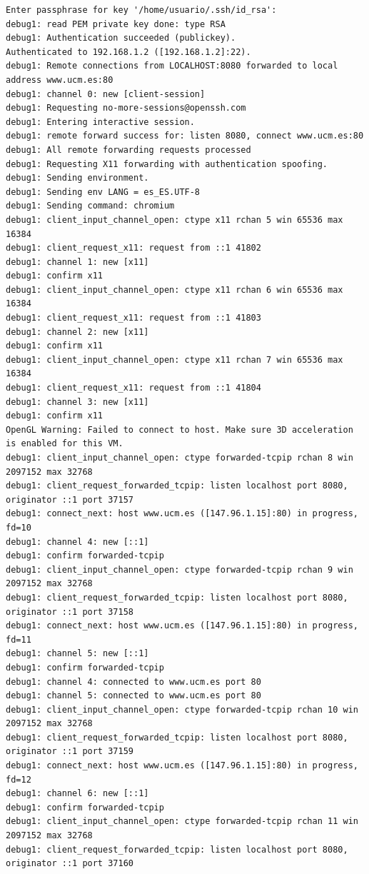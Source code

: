 \documentclass[11pt]{article}
\begin{document}
\begin{lstlisting}
Enter passphrase for key '/home/usuario/.ssh/id_rsa': 
debug1: read PEM private key done: type RSA
debug1: Authentication succeeded (publickey).
Authenticated to 192.168.1.2 ([192.168.1.2]:22).
debug1: Remote connections from LOCALHOST:8080 forwarded to local address www.ucm.es:80
debug1: channel 0: new [client-session]
debug1: Requesting no-more-sessions@openssh.com
debug1: Entering interactive session.
debug1: remote forward success for: listen 8080, connect www.ucm.es:80
debug1: All remote forwarding requests processed
debug1: Requesting X11 forwarding with authentication spoofing.
debug1: Sending environment.
debug1: Sending env LANG = es_ES.UTF-8
debug1: Sending command: chromium
debug1: client_input_channel_open: ctype x11 rchan 5 win 65536 max 16384
debug1: client_request_x11: request from ::1 41802
debug1: channel 1: new [x11]
debug1: confirm x11
debug1: client_input_channel_open: ctype x11 rchan 6 win 65536 max 16384
debug1: client_request_x11: request from ::1 41803
debug1: channel 2: new [x11]
debug1: confirm x11
debug1: client_input_channel_open: ctype x11 rchan 7 win 65536 max 16384
debug1: client_request_x11: request from ::1 41804
debug1: channel 3: new [x11]
debug1: confirm x11
OpenGL Warning: Failed to connect to host. Make sure 3D acceleration is enabled for this VM.
debug1: client_input_channel_open: ctype forwarded-tcpip rchan 8 win 2097152 max 32768
debug1: client_request_forwarded_tcpip: listen localhost port 8080, originator ::1 port 37157
debug1: connect_next: host www.ucm.es ([147.96.1.15]:80) in progress, fd=10
debug1: channel 4: new [::1]
debug1: confirm forwarded-tcpip
debug1: client_input_channel_open: ctype forwarded-tcpip rchan 9 win 2097152 max 32768
debug1: client_request_forwarded_tcpip: listen localhost port 8080, originator ::1 port 37158
debug1: connect_next: host www.ucm.es ([147.96.1.15]:80) in progress, fd=11
debug1: channel 5: new [::1]
debug1: confirm forwarded-tcpip
debug1: channel 4: connected to www.ucm.es port 80
debug1: channel 5: connected to www.ucm.es port 80
debug1: client_input_channel_open: ctype forwarded-tcpip rchan 10 win 2097152 max 32768
debug1: client_request_forwarded_tcpip: listen localhost port 8080, originator ::1 port 37159
debug1: connect_next: host www.ucm.es ([147.96.1.15]:80) in progress, fd=12
debug1: channel 6: new [::1]
debug1: confirm forwarded-tcpip
debug1: client_input_channel_open: ctype forwarded-tcpip rchan 11 win 2097152 max 32768
debug1: client_request_forwarded_tcpip: listen localhost port 8080, originator ::1 port 37160

\end{lstlisting}
\end{document}
